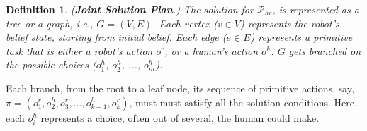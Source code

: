\documentclass[letterpaper]{article} %
\newtheorem{definition}{Definition}
\begin{document}

\begin{definition} \label{def:joint-sol-plan}
(\textbf{Joint Solution Plan}.) 
{The solution for $\mathcal{P}_{hr}$, is represented as a tree or a graph, i.e., $G=(V,E)$. Each vertex ($v \in V$) represents the robot's belief state, starting from initial belief. Each edge ($e \in E$) represents a primitive task that is either a robot's action $o^{r}$, or a human's action $o^{h}$. $G$ gets branched on the possible choices ($o^{h}_1$, $o^{h}_2$, ..., $o^{h}_m$). 
}  
\end{definition}

Each branch, from the root to a leaf node, its sequence of primitive actions, say,  $\pi=(o_1^r,o_2^h,o_3^r,...,o_{k-1}^h,o_k^r)$, must must satisfy all the solution conditions. 
Here, each $o_i^h$ represents a choice, often out of several, the human could make.
\end{document}

